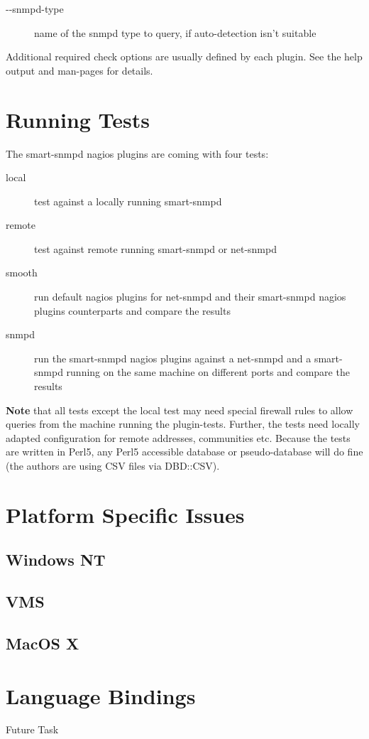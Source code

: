 \begin{description}
\item[-\--snmpd-type] name of the snmpd type to query, if auto-detection isn't suitable
\end{description}

Additional required check options are usually defined by each plugin. See
the help output and man-pages for details.

\section{Running Tests}

The smart-snmpd nagios plugins are coming with four tests:

\begin{description}
\item[local] test against a locally running smart-snmpd
\item[remote] test against remote running smart-snmpd or net-snmpd
\item[smooth] run default nagios plugins for net-snmpd and their smart-snmpd nagios plugins counterparts and compare the results
\item[snmpd] run the smart-snmpd nagios plugins against a net-snmpd and a smart-snmpd running on the same machine on different ports and compare the results
\end{description}

\textbf{Note} that all tests except the local test may need special firewall
rules to allow queries from the machine running the plugin-tests. Further,
the tests need locally adapted configuration for remote addresses,
communities etc. Because the tests are written in Perl5, any Perl5
accessible database or pseudo-database will do fine (the authors are using
CSV files via DBD::CSV).

\section{Platform Specific Issues}

\subsection{Windows NT}

\subsection{VMS}

\subsection{MacOS X}

\section{Language Bindings}

Future Task


